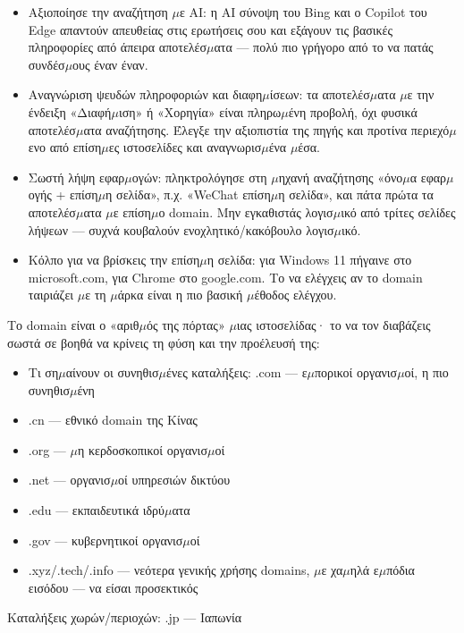 \begin{itemize}
  \item Αξιοποίησε την αναζήτηση $\mu$ε AI: η AI σύνοψη του Bing και ο Copilot του Edge απαντούν απευθείας στις ερωτήσεις σου και εξάγουν τις βασικές πληροφορίες από άπειρα αποτελέσ$\mu$ατα — πολύ πιο γρήγορο από το να πατάς συνδέσ$\mu$ους έναν έναν.
  \item Αναγνώριση ψευδών πληροφοριών και διαφη$\mu$ίσεων: τα αποτελέσ$\mu$ατα $\mu$ε την ένδειξη «Διαφή$\mu$ιση» ή «Χορηγία» είναι πληρω$\mu$ένη προβολή, όχι φυσικά αποτελέσ$\mu$ατα αναζήτησης. Έλεγξε την αξιοπιστία της πηγής και προτίνα περιεχό$\mu$ενο από επίση$\mu$ες ιστοσελίδες και αναγνωρισ$\mu$ένα $\mu$έσα.
  \item Σωστή λήψη εφαρ$\mu$ογών: πληκτρολόγησε στη $\mu$ηχανή αναζήτησης «όνο$\mu$α εφαρ$\mu$ογής + επίση$\mu$η σελίδα», π.χ. «WeChat επίση$\mu$η σελίδα», και πάτα πρώτα τα αποτελέσ$\mu$ατα $\mu$ε επίση$\mu$ο domain. Μην εγκαθιστάς λογισ$\mu$ικό από τρίτες σελίδες λήψεων — συχνά κουβαλούν ενοχλητικό/κακόβουλο λογισ$\mu$ικό.
  \item Κόλπο για να βρίσκεις την επίση$\mu$η σελίδα: για Windows 11 πήγαινε στο microsoft.com, για Chrome στο google.com. Το να ελέγχεις αν το domain ταιριάζει $\mu$ε τη $\mu$άρκα είναι η πιο βασική $\mu$έθοδος ελέγχου.
\end{itemize}


Το domain είναι ο «αριθ$\mu$ός της πόρτας» $\mu$ιας ιστοσελίδας· το να τον διαβάζεις σωστά σε βοηθά να κρίνεις τη φύση και την προέλευσή της:

\begin{itemize}
  \item Τι ση$\mu$αίνουν οι συνηθισ$\mu$ένες καταλήξεις: .com — ε$\mu$πορικοί οργανισ$\mu$οί, η πιο συνηθισ$\mu$ένη
  \item .cn — εθνικό domain της Κίνας
  \item .org — $\mu$η κερδοσκοπικοί οργανισ$\mu$οί
  \item .net — οργανισ$\mu$οί υπηρεσιών δικτύου
  \item .edu — εκπαιδευτικά ιδρύ$\mu$ατα
  \item .gov — κυβερνητικοί οργανισ$\mu$οί
  \item .xyz/.tech/.info — νεότερα γενικής χρήσης domains, $\mu$ε χα$\mu$ηλά ε$\mu$πόδια εισόδου — να είσαι προσεκτικός
\end{itemize}

Καταλήξεις χωρών/περιοχών: .jp — Ιαπωνία

